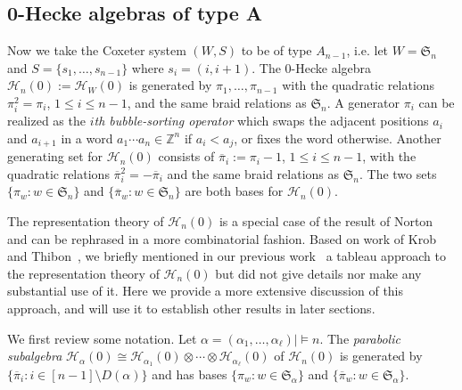\documentclass{amsart}
\newtheorem*{Young's Rule}{Young's Rule}
\theoremstyle{definition}
\theoremstyle{remark}
\numberwithin{equation}{section}
\begin{document}
\subsection{0-Hecke algebras of type A}\label{sec:H0A}
Now we take the Coxeter system $(W,S)$ to be of type $A_{n-1}$, i.e. let $W={{\mathfrak S}}_n$ and $S=\{s_1,\ldots,s_{n-1}\}$ where $s_i=(i,i+1)$. The $0$-Hecke algebra ${\mathcal{H}}_n(0):={\mathcal{H}}_W(0)$ is generated by $\pi_1,\ldots,\pi_{n-1}$ with the quadratic relations $\pi_i^2=\pi_i$, $1\le i\le n-1$, and the same braid relations as ${{\mathfrak S}}_n$. A generator $\pi_i$ can be realized as the \emph{$i$th bubble-sorting operator} which swaps the adjacent positions $a_i$ and $a_{i+1}$ in a word $a_1\cdots a_n\in{{\mathbb Z}}^n$ if $a_i<a_j$, or fixes the word otherwise. Another generating set for ${\mathcal{H}}_n(0)$ consists of ${\overline{\pi}}_i:=\pi_i-1$, $1\le i\le n-1$, with the quadratic relations ${\overline{\pi}}_i^2=-{\overline{\pi}}_i$ and the same braid relations as ${{\mathfrak S}}_n$. The two sets $\{\pi_w:w\in{{\mathfrak S}}_n\}$ and $\{{\overline{\pi}}_w:w\in{{\mathfrak S}}_n\}$ are both bases for ${\mathcal{H}}_n(0)$.

The representation theory of ${\mathcal{H}}_n(0)$ is a special case of the result of Norton~\cite{Norton} and can be  rephrased in a more combinatorial fashion. Based on work of Krob and Thibon~\cite{KrobThibon}, we briefly mentioned in our previous work~\cite{H0CF, H0SR} a tableau approach to the representation theory of ${\mathcal{H}}_n(0)$ but did not give details nor make any substantial use of it. Here we provide a more extensive discussion of this approach, and will use it to establish other results in later sections.

We first review some notation. Let $\alpha=(\alpha_1,\ldots,\alpha_\ell)\mid\models n$. The \emph{parabolic subalgebra} ${\mathcal{H}}_\alpha(0)\cong {\mathcal{H}}_{\alpha_1}(0)\otimes\cdots\otimes {\mathcal{H}}_{\alpha_\ell}(0)$ of ${\mathcal{H}}_n(0)$ is generated by $\{{\overline{\pi}}_i:i\in [n-1]\setminus D(\alpha)\}$ and has bases $\{\pi_w:w\in{{\mathfrak S}}_\alpha\}$ and $\{{\overline{\pi}}_w:w\in{{\mathfrak S}}_\alpha\}$.
\end{document}
